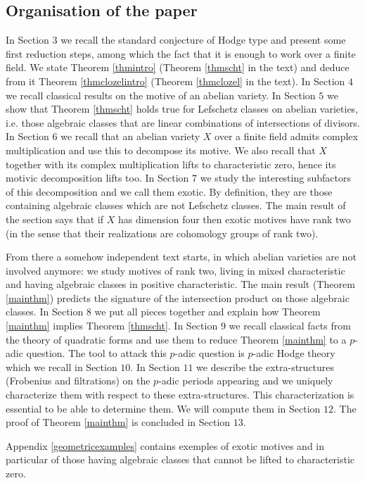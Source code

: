 \subsection*{Organisation of the paper}
In Section $3$ we recall the standard conjecture of Hodge type and present some first reduction steps, among which the fact that it is enough to work over a finite field. We state Theorem \ref{thmintro} (Theorem \ref{thmscht} in the text) and deduce from it Theorem \ref{thmclozelintro} (Theorem \ref{thmclozel} in the text). In Section $4$ we recall classical results on the motive of an abelian variety. In Section $5$ we show that Theorem \ref{thmscht} holds true for Lefschetz classes on abelian varieties, i.e. those algebraic classes that are linear combinations of intersections of divisors. In Section $6$ we recall that an abelian variety $X$ over a finite field admits complex multiplication and use this to decompose its   motive. We also recall that $X$ together with its complex multiplication lifts to characteristic zero, hence its motivic decomposition lifts too. In Section $7$ we study the interesting subfactors of this decomposition and we call them exotic. By definition, they are those containing algebraic classes which are not Lefschetz classes. The main result of the section says that if $X$ has dimension four then exotic motives have rank two (in the sense that their realizations are cohomology groups of rank two).

From there a somehow independent text starts, in which abelian varieties are not involved anymore: we study motives of rank two, living in mixed characteristic and having algebraic classes in positive characteristic. The main result (Theorem \ref{mainthm}) predicts the signature of the intersection product on those algebraic classes. In Section $8$ we put all pieces together and explain how Theorem \ref{mainthm} implies Theorem \ref{thmscht}. In Section $9$ we recall classical facts   from the theory of quadratic forms and use them to reduce Theorem \ref{mainthm}  to a $p$-adic question. The tool to attack this $p$-adic question is $p$-adic Hodge theory which we recall in Section $10$. In Section $11$ we describe the extra-structures (Frobenius and filtrations) on the   $p$-adic periods appearing and we uniquely characterize them with respect to these extra-structures. This characterization is essential to be able to determine them. We will compute them in  Section $12$. The proof of Theorem \ref{mainthm} is concluded in Section $13$.

Appendix \ref{geometricexamples} contains exemples of exotic motives and in particular of those having algebraic classes that cannot be lifted to characteristic zero.
